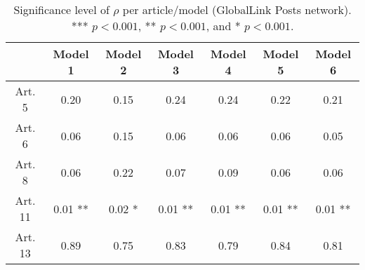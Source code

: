 \begin{table}[ht]
\centering
\begin{tabular}{ccccccc}
  \toprule
 & Model 1 & Model 2 & Model 3 & Model 4 & Model 5 & Model 6 \\ 
  \midrule
Art. 5 & 0.20   & 0.15   & 0.24   & 0.24   & 0.22   & 0.21   \\ 
   \midrule
Art. 6 & 0.06   & 0.15   & 0.06   & 0.06   & 0.06   & 0.05   \\ 
   \midrule
Art. 8 & 0.06   & 0.22   & 0.07   & 0.09   & 0.06   & 0.06   \\ 
   \midrule
Art. 11 & 0.01 ** & 0.02 * & 0.01 ** & 0.01 ** & 0.01 ** & 0.01 ** \\ 
   \midrule
Art. 13 & 0.89   & 0.75   & 0.83   & 0.79   & 0.84   & 0.81   \\ 
   \bottomrule
\end{tabular}
\caption{Significance level of $\rho$ per article/model (GlobalLink Posts network). *** $p < 0.001$, ** $p < 0.001$, and * $p < 0.001$.} 
\end{table}
